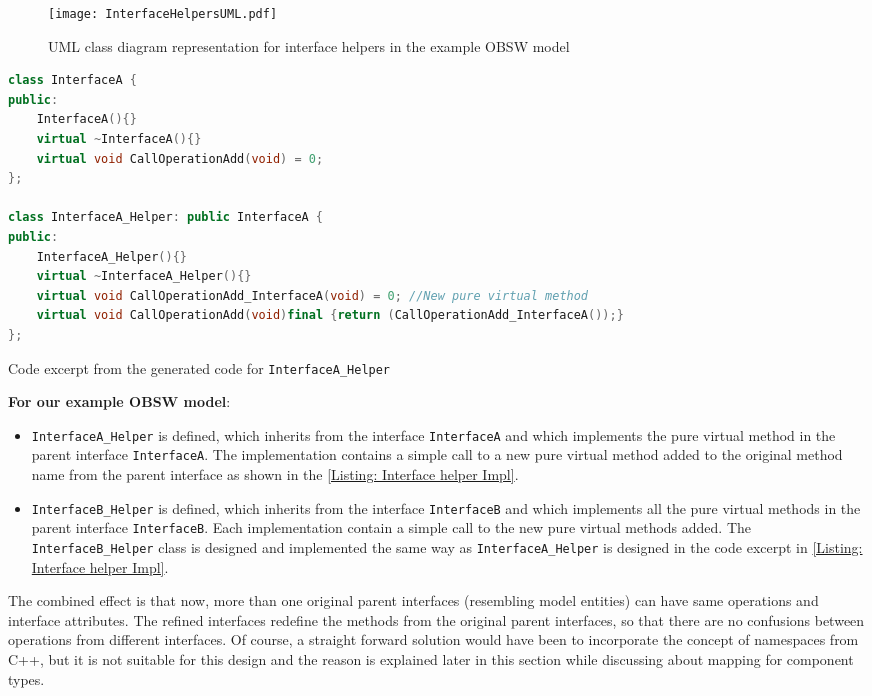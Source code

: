 \begin{figure}[h]
	\centering
	\texttt{[image: InterfaceHelpersUML.pdf]}
	\caption{UML class diagram representation for interface helpers in the example OBSW model}
	\label{fig: Interface helpers UML}
\end{figure}

\begin{Listing}
\begin{lstlisting}[language=C++]
class InterfaceA {
public:
	InterfaceA(){}
	virtual ~InterfaceA(){}
	virtual void CallOperationAdd(void) = 0;
};

class InterfaceA_Helper: public InterfaceA {
public:
	InterfaceA_Helper(){}
	virtual ~InterfaceA_Helper(){}
	virtual void CallOperationAdd_InterfaceA(void) = 0; //New pure virtual method
	virtual void CallOperationAdd(void)final {return (CallOperationAdd_InterfaceA());}
};
\end{lstlisting}
\caption{Code excerpt from the generated code for \texttt{InterfaceA\allowbreak\_Helper}}
\label{Listing: Interface helper Impl}
\end{Listing}

\textbf{For our example OBSW model}:
\begin{itemize}
\item \texttt{InterfaceA\allowbreak\_Helper} is defined, which inherits from the interface \texttt{InterfaceA} and which implements the pure virtual method in the parent interface \texttt{InterfaceA}. The implementation contains a simple call to a new pure virtual method added to the original method name from the parent interface as shown in the \cref{Listing: Interface helper Impl}.

\item \texttt{InterfaceB\allowbreak\_Helper} is defined, which inherits from the interface \texttt{InterfaceB} and which implements all the pure virtual methods in the parent interface \texttt{InterfaceB}. Each implementation contain a simple call to the new pure virtual methods added. The \texttt{InterfaceB\allowbreak\_Helper} class is designed and implemented the same way as \texttt{InterfaceA\allowbreak\_Helper} is designed in the code excerpt in \cref{Listing: Interface helper Impl}.   
\end{itemize}

The combined effect is that now, more than one original parent interfaces (resembling model entities) can have same operations and interface attributes. The refined interfaces redefine the methods from the original parent interfaces, so that there are no confusions between operations from different interfaces. Of course, a straight forward solution would have been to incorporate the concept of namespaces from C++, but it is not suitable for this design and the reason is explained later in this section while discussing about mapping for component types. 


